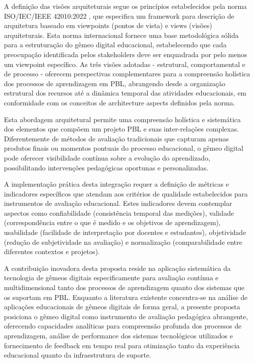 \documentclass[12pt,a4paper]{article}
\renewcommand{\cite}[1]{}
\begin{document}
A definição das visões arquiteturais segue os princípios estabelecidos pela
norma ISO/IEC/IEEE 42010:2022 \cite{iso42010}, que especifica um framework para
descrição de arquitetura baseado em viewpoints (pontos de vista) e views
(visões) arquiteturais. Esta norma internacional fornece uma base metodológica
sólida para a estruturação do gêmeo digital educacional, estabelecendo que cada
preocupação identificada pelos stakeholders deve ser enquadrada por pelo menos
um viewpoint específico. As três visões adotadas - estrutural, comportamental e
de processo - oferecem perspectivas complementares para a compreensão holística
dos processos de aprendizagem em PBL, abrangendo desde a organização estrutural
dos recursos até a dinâmica temporal das atividades educacionais, em
conformidade com os conceitos de architecture aspects definidos pela norma.

Esta abordagem arquitetural permite uma compreensão holística e sistemática dos
elementos que compõem um projeto PBL e suas inter-relações complexas.
Diferentemente de métodos de avaliação tradicionais que capturam apenas
produtos finais ou momentos pontuais do processo educacional, o gêmeo digital
pode oferecer visibilidade contínua sobre a evolução do aprendizado,
possibilitando intervenções pedagógicas oportunas e personalizadas.

A implementação prática desta integração requer a definição de métricas e
indicadores específicos que atendam aos critérios de qualidade estabelecidos
para instrumentos de avaliação educacional. Estes indicadores devem contemplar
aspectos como confiabilidade (consistência temporal das medições), validade
(correspondência entre o que é medido e os objetivos de aprendizagem),
usabilidade (facilidade de interpretação por docentes e estudantes),
objetividade (redução de subjetividade na avaliação) e normalização
(comparabilidade entre diferentes contextos e projetos).

A contribuição inovadora desta proposta reside na aplicação sistemática da
tecnologia de gêmeos digitais especificamente para avaliação contínua e
multidimensional tanto dos processos de aprendizagem quanto dos sistemas que os
suportam em PBL. Enquanto a literatura existente \cite{bachmann2023}
concentra-se na análise de aplicações educacionais de gêmeos digitais de forma
geral, a presente proposta posiciona o gêmeo digital como instrumento de
avaliação pedagógica abrangente, oferecendo capacidades analíticas para
compreensão profunda dos processos de aprendizagem, análise de performance dos
sistemas tecnológicos utilizados e fornecimento de feedback em tempo real para
otimização tanto da experiência educacional quanto da infraestrutura de
suporte.
\end{document}
